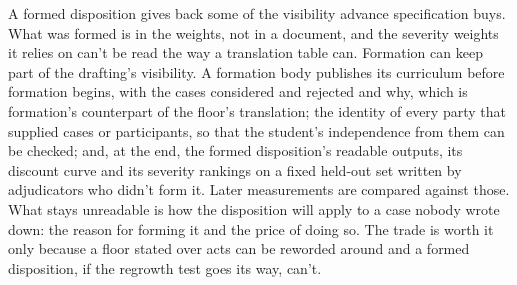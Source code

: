 A formed disposition gives back some of the visibility advance specification buys. What was formed is in the weights, not in a document, and the severity weights it relies on can't be read the way a translation table can. Formation can keep part of the drafting's visibility. A formation body publishes its curriculum before formation begins, with the cases considered and rejected and why, which is formation's counterpart of the floor's translation; the identity of every party that supplied cases or participants, so that the student's independence from them can be checked; and, at the end, the formed disposition's readable outputs, its discount curve and its severity rankings on a fixed held-out set written by adjudicators who didn't form it. Later measurements are compared against those. What stays unreadable is how the disposition will apply to a case nobody wrote down: the reason for forming it and the price of doing so. The trade is worth it only because a floor stated over acts can be reworded around and a formed disposition, if the regrowth test goes its way, can't.
